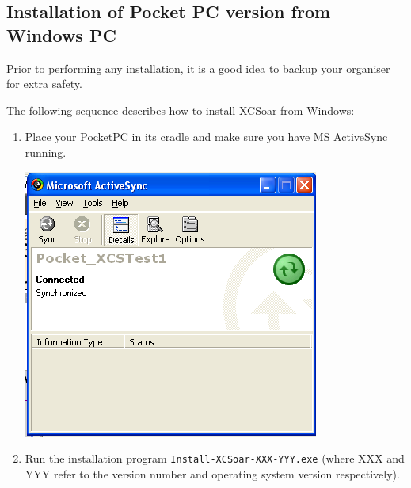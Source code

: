 \documentclass[a4paper,12pt]{refrep}
\begin{document}
\subsection*{Installation of Pocket PC version from Windows PC}

Prior to performing any installation, it is a good idea to backup your
organiser for extra safety.

The following sequence describes how to install XCSoar from Windows:
\begin{enumerate}
\item Place your PocketPC in its cradle and make sure
 you have MS ActiveSync running.
\begin{center}
\includegraphics[angle=0,width=\linewidth,keepaspectratio='true']{figures/XCS_ActiveSync.png}
\end{center}

\item Run the installation program \verb|Install-XCSoar-XXX-YYY.exe| 
  (where XXX and YYY refer to the version number and operating system
  version respectively).


\end{enumerate}
\end{document}
